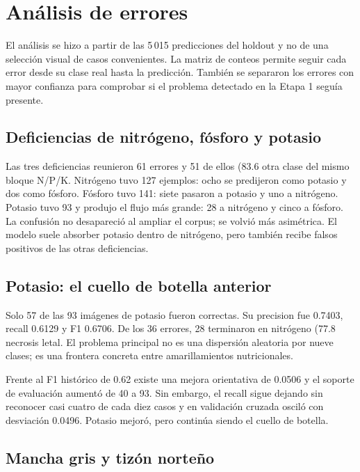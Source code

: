 \section{Análisis de errores}

El análisis se hizo a partir de las 5\,015 predicciones del holdout y no de una
selección visual de casos convenientes. La matriz de conteos permite seguir
cada error desde su clase real hasta la predicción. También se separaron los
errores con mayor confianza para comprobar si el problema detectado en la
Etapa 1 seguía presente.

\subsection{Deficiencias de nitrógeno, fósforo y potasio}

Las tres deficiencias reunieron 61 errores y 51 de ellos (83.6%
otra clase del mismo bloque N/P/K. Nitrógeno tuvo 127 ejemplos: ocho se
predijeron como potasio y dos como fósforo. Fósforo tuvo 141: siete pasaron a
potasio y uno a nitrógeno. Potasio tuvo 93 y produjo el flujo más grande: 28 a
nitrógeno y cinco a fósforo. La confusión no desapareció al ampliar el corpus;
se volvió más asimétrica. El modelo suele absorber potasio dentro de nitrógeno,
pero también recibe falsos positivos de las otras deficiencias.

\subsection{Potasio: el cuello de botella anterior}

Solo 57 de las 93 imágenes de potasio fueron correctas. Su precision fue 0.7403,
recall 0.6129 y F1 0.6706. De los 36 errores, 28 terminaron en nitrógeno
(77.8%
necrosis letal. El problema principal no es una dispersión aleatoria por nueve
clases; es una frontera concreta entre amarillamientos nutricionales.

Frente al F1 histórico de 0.62 existe una mejora orientativa de 0.0506 y el
soporte de evaluación aumentó de 40 a 93. Sin embargo, el recall sigue dejando
sin reconocer casi cuatro de cada diez casos y en validación cruzada osciló con
desviación 0.0496. Potasio mejoró, pero continúa siendo el cuello de botella.

\subsection{Mancha gris y tizón norteño}

